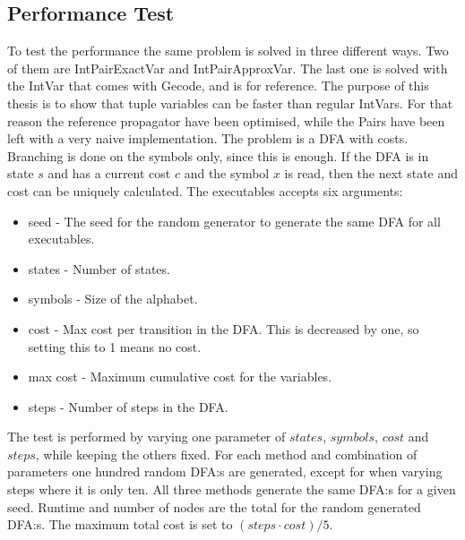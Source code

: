 \documentclass[a4paper,11pt]{article}
\begin{document}
\subsection{Performance Test}
\label{sec:performancetest}
To test the performance the same problem is solved in three different ways. Two of them are IntPairExactVar and IntPairApproxVar. The last one is solved with the IntVar that comes with Gecode, and is for reference. The purpose of this thesis is to show that tuple variables can be faster than regular IntVars. For that reason the reference propagator have been optimised, while the Pairs have been left with a very naive implementation. The problem is a DFA with costs. Branching is done on the symbols only, since this is enough. If the DFA is in state $s$ and has a current cost $c$ and the symbol $x$ is read, then the next state and cost can be uniquely calculated. The executables accepts six arguments: 
\begin{itemize}
\item{seed} - The seed for the random generator to generate the same DFA for all executables.
\item{states} - Number of states.
\item{symbols} - Size of the alphabet.
\item{cost} - Max cost per transition in the DFA. This is decreased by one, so setting this to 1 means no cost.
\item{max cost} - Maximum cumulative cost for the variables.
\item{steps} - Number of steps in the DFA.
\end{itemize}
The test is performed by varying one parameter of $states$, $symbols$, $cost$ and $steps$, while keeping the others fixed. For each method and combination of parameters one hundred random DFA:s are generated, except for when varying steps where it is only ten. All three methods generate the same DFA:s for a given seed. Runtime and number of nodes are the total for the random generated DFA:s. The maximum total cost is set to $(steps\cdot cost)/5$.






%
\end{document}
